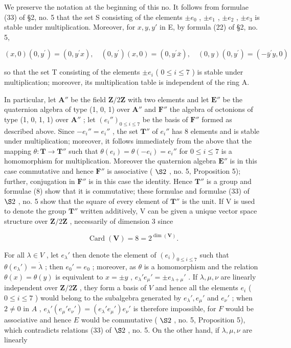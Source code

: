 We preserve the notation at the beginning of this no. It follows from formulae (33) of §2, no. 5 that the set S consisting of the elements \(\pm e_0\) , \(\pm e_1\) , \(\pm e_2\) , \(\pm e_3\) is stable under multiplication. Moreover, for \(x, y, y'\) in E, by formula (22) of §2, no. 5,

\[
(x, 0) (0, y ^ {\prime}) = (0, y ^ {\prime} x), \quad (0, y ^ {\prime}) (x, 0) = (0, y ^ {\prime} \bar {x}), \quad (0, y) (0, y ^ {\prime}) = (- \bar {y} ^ {\prime} y, 0)\tag{8}
\]

so that the set T consisting of the elements \(\pm e_{i}\) ( \(0 \leqslant i \leqslant 7\) ) is stable under multiplication; moreover, its multiplication table is independent of the ring A.

In particular, let \(\mathbf{A}''\) be the field \(\mathbf{Z}/2\mathbf{Z}\) with two elements and let \(\mathbf{E}''\) be the quaternion algebra of type (1, 0, 1) over \(\mathbf{A}''\) and \(\mathbf{F}''\) the algebra of octonions of type (1, 0, 1, 1) over \(\mathbf{A}''\) ; let \((e_i'')_{0 \leq i \leq 7}\) be the basis of \(\mathbf{F}''\) formed as described above. Since \(-e_i'' = e_i''\) , the set \(\mathbf{T}''\) of \(e_i''\) has 8 elements and is stable under multiplication; moreover, it follows immediately from the above that the mapping \(\theta: \mathbf{T} \to \mathbf{T}''\) such that \(\theta(e_i) = \theta(-e_i) = e_i''\) for \(0 \leq i \leq 7\) is a homomorphism for multiplication. Moreover the quaternion algebra \(\mathbf{E}''\) is in this case commutative and hence \(\mathbf{F}''\) is associative ( \(\S 2\) , no. 5, Proposition 5); further, conjugation in \(\mathbf{F}''\) is in this case the identity. Hence \(\mathbf{T}''\) is a group and formulae (8) show that it is commutative; these formulae and formulae (33) of \(\S 2\) , no. 5 show that the square of every element of \(\mathbf{T}''\) is the unit. If V is used to denote the group \(\mathbf{T}''\) written additively, V can be given a unique vector space structure over \(\mathbf{Z}/2\mathbf{Z}\) , necessarily of dimension 3 since

\[
\operatorname{Card} (\mathbf {V}) = 8 = 2 ^ {\dim (\mathbf {V})}.
\]

For all \(\lambda \in V\) , let \(e_{\lambda}'\) then denote the element of \((e_i)_{0 \leq i \leq 7}\) such that \(\theta(e_{\lambda}') = \dot{\lambda}\) ; then \(e_0' = e_0\) ; moreover, as \(\theta\) is a homomorphism and the relation \(\theta(x) = \theta(y)\) is equivalent to \(x = \pm y\) , \(e_{\lambda}' e_{\mu}' = \pm e_{\lambda + \mu}'\) . If \(\lambda, \mu, \nu\) are linearly independent over \(\mathbf{Z}/2\mathbf{Z}\) , they form a basis of \(V\) and hence all the elements \(e_i\) ( \(0 \leqslant i \leqslant 7\) ) would belong to the subalgebra generated by \(e_{\lambda}', e_{\mu}'\) and \(e_{\nu}'\) ; when \(2 \neq 0\) in \(A\) , \(e_{\lambda}'(e_{\mu}' e_{\nu}') = (e_{\lambda}' e_{\mu}') e_{\nu}'\) is therefore impossible, for \(F\) would be associative and hence \(E\) would be commutative ( \(\S 2\) , no. 5, Proposition 5), which contradicts relations (33) of \(\S 2\) , no. 5. On the other hand, if \(\lambda, \mu, \nu\) are linearly

